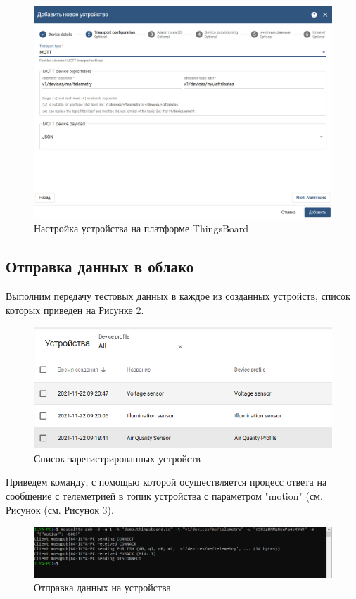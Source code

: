 \documentclass[utf8x]{G7-32} %
\newcommand{\tb}{ThingsBoard~}
\begin{document}
\begin{figure}[h!]
	\centering
	\includegraphics[width=0.7\linewidth]{images/task9-create2}
	\caption{Настройка устройства на платформе \tb}
	\label{fig:task9-create2}
\end{figure}

\subsection{Отправка данных в облако}

Выполним передачу тестовых данных в каждое из созданных устройств, список которых приведен на Рисунке \ref{fig:devices}.

\begin{figure}[h!]
	\centering
	\includegraphics[width=0.7\linewidth]{images/devices}
	\caption{Список зарегистрированных устройств}
	\label{fig:devices}
\end{figure}

Приведем команду, с помощью которой осуществляется процесс ответа на сообщение с телеметрией в топик устройства с параметром "motion" (см. Рисунок (см. Рисунок \ref{fig:send}).

\begin{figure}[h!]
	\centering
	\includegraphics[width=0.7\linewidth]{images/send}
	\caption{Отправка данных на устройства}
	\label{fig:send}
\end{figure}
\end{document}
